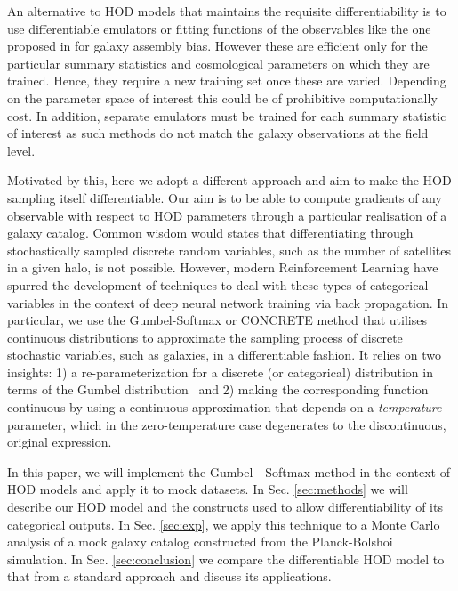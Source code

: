 \documentclass[a4paper,usenatbib]{mnras}
\newcommand{\FL}[1]{{\color{magenta}FL: #1}}
\begin{document}
An alternative to HOD models that maintains the requisite differentiability is to use differentiable emulators \citep{2015ApJ...810...35K,2020MNRAS.492.2872W} or fitting functions of the observables like the one proposed in \citet{2021arXiv210505859H} for galaxy assembly bias. 
However these are efficient only for the particular summary statistics and cosmological parameters on which they are trained.
Hence, they require a new training set once these are varied. 
Depending on the parameter space of interest this could be of prohibitive computationally cost. 
In addition, separate emulators must be trained for each summary statistic of interest as such methods do not match the galaxy observations at the field level.


Motivated by this, here we adopt a different approach and aim to make the HOD sampling itself differentiable.
Our aim is to be able to compute gradients of any observable with respect to HOD parameters through a particular realisation of a galaxy catalog. 
Common wisdom would states that differentiating through stochastically sampled discrete random variables, such as the number of satellites in a given halo, is not possible. 
However, modern Reinforcement Learning have spurred the development of techniques to deal with these types of categorical variables in the context of deep neural network training via back propagation. 
In particular, we use the Gumbel-Softmax or CONCRETE method \citep{2016arXiv161101144J,2016arXiv161100712M} 
that utilises continuous distributions to approximate the sampling process of discrete stochastic variables, such as galaxies, in a differentiable fashion. %
It relies on two insights: 1) a re-parameterization for a discrete (or categorical) 
distribution in terms of the Gumbel distribution~\citep[referred to as the ``Gumbel trick''][]{2014arXiv1411.0030M} 
and 2) making the corresponding function continuous by using a continuous approximation that depends on a \textit{temperature} parameter, which in the zero-temperature case degenerates to the discontinuous, original expression. 


In this paper, we will implement the Gumbel - Softmax method in the context of HOD models and apply it to mock datasets. In Sec. \ref{sec:methods} we will describe our HOD model and the constructs used to allow differentiability of its categorical outputs. In Sec. \ref{sec:exp}, we apply this technique to a Monte Carlo analysis of a mock galaxy catalog constructed from the Planck-Bolshoi simulation. In Sec. \ref{sec:conclusion} we compare the differentiable HOD model to that from a standard approach and discuss its applications.
\end{document}
